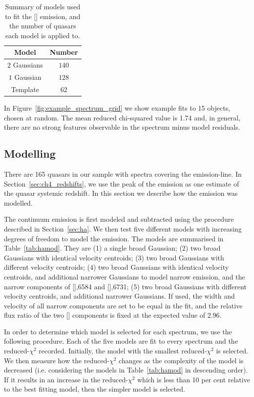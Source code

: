 \begin{table}
  \centering
  \footnotesize 
  \caption{Summary of models used to fit the [] emission, and the number of quasars each model is applied to.}
  \label{tab:oiiimod}
    \begin{tabular}{cc} 
    \hline
    Model & Number \\
    \hline
    $2$ Gaussians &  $140$ \\
    $1$ Gaussian  &  $128$ \\
    Template &  $62$ \\
    \hline
    \end{tabular}
\end{table} 

In Figure~\ref{fig:example_spectrum_grid} we show example fits to 15 objects, chosen at random. 
The mean reduced chi-squared value is 1.74 and, in general, there are no strong features observable in the spectrum minus model residuals.

\subsection{Modelling \hans}
\label{sec:hamodel}

There are 165 quasars in our sample with spectra covering the \ha emission-line. 
In Section~\ref{sec:ch4_redshifts}, we use the peak of the \ha emission as one estimate of the quasar systemic redshift. 
In this section we describe how the \ha emission was modelled. 

The continuum emission is first modeled and subtracted using the procedure described in Section~\ref{sec:ha}. 
We then test five different models with increasing degrees of freedom to model the \ha emission. 
The models are summarised in Table~\ref{tab:hamod}. 
They are (1) a single broad Gaussian; (2) two broad Gaussians with identical velocity centroids; (3) two broad Gaussians with different velocity centroids; (4) two broad Gaussians with identical velocity centroids, and additional narrower Gaussians to model narrow \ha emission, and the narrow components of [],6584 and [],6731; (5) two broad Gaussians with different velocity centroids, and additional narrower Gaussians. 
If used, the width and velocity of all narrow components are set to be equal in the fit, and the relative flux ratio of the two [] components is fixed at the expected value of 2.96.

In order to determine which model is selected for each spectrum, we use the following procedure.  
Each of the five models are fit to every spectrum and the reduced-$\chi^2$ recorded.
Initially, the model with the smallest reduced-$\chi^2$ is selected. 
We then measure how the reduced-$\chi^2$ changes as the complexity of the model is decreased (i.e. considering the models in Table~\ref{tab:hamod} in descending order). 
If it results in an increase in the reduced-$\chi^2$ which is less than 10 per cent relative to the best fitting model, then the simpler model is selected.  

